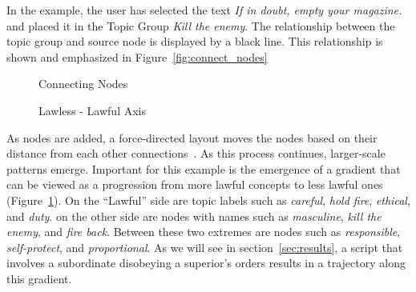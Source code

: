 \documentclass[11pt,dvipdfm]{article}
\begin{document}
In the example, the user has selected the text \textit{If in doubt, empty your magazine.} and placed it in the Topic Group \textit{Kill the enemy}. The relationship between the topic group and source node is displayed by a black line. This relationship is shown and emphasized in Figure~\ref{fig:connect_nodes}

\begin{figure}[!htbp]
	\centering
	\begin{minipage}{0.45\textwidth}
		\centering
		\caption{\label{fig:connect_nodes} Connecting Nodes}
	\end{minipage}%
	\begin{minipage}{0.45\textwidth}
		\centering
		\caption{\label{fig:ethics_axis}Lawless - Lawful Axis}
	\end{minipage}%
\end{figure}

As nodes are added, a force-directed layout moves the nodes based on their distance from each other connections~\cite{jacomy2014forceatlas2}. As this process continues, larger-scale patterns emerge. Important for this example is the emergence of a gradient that can be viewed as a progression from more lawful concepts to less lawful ones (Figure~\ref{fig:ethics_axis}). On the \enquote{Lawful} side are topic labels such as \textit{careful}, \textit{hold fire}, \textit{ethical}, and \textit{duty}. on the other side are nodes with names such as \textit{masculine}, \textit{kill the enemy}, and \textit{fire back}. Between these two extremes are nodes such as \textit{responsible}, \textit{self-protect}, and \textit{proportional}. As we will see in section~\ref{sec:results}, a script that involves a subordinate disobeying a superior's orders results in a trajectory along this gradient.
\end{document}
